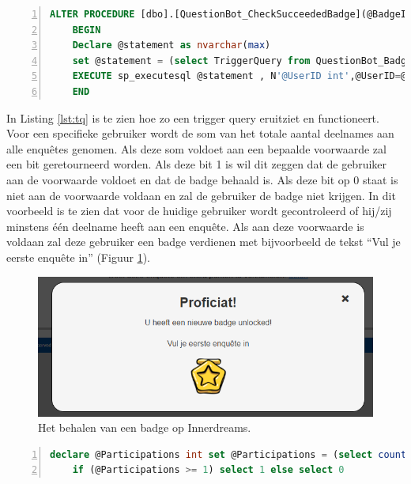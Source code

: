 \begin{lstlisting}[caption={De CheckSucceededBadge stored procedure.},
    label={lst:csb},
    language=SQL,
    showspaces=false,
    basicstyle=\ttfamily,
    numbers=left,
    numberstyle=\tiny,
    numbersep=1pt,
    breaklines=true
    commentstyle=\color{gray}]
    ALTER PROCEDURE [dbo].[QuestionBot_CheckSucceededBadge](@BadgeID int, @UserID int) as
    BEGIN
    Declare @statement as nvarchar(max) 
    set @statement = (select TriggerQuery from QuestionBot_Badge where ID = @BadgeID) 
    EXECUTE sp_executesql @statement , N'@UserID int',@UserID=@UserID
    END
\end{lstlisting}

In Listing \ref{lst:tq} is te zien hoe zo een trigger query eruitziet en functioneert. Voor een specifieke gebruiker wordt de som van het totale aantal deelnames aan alle enquêtes genomen. Als deze som voldoet aan een bepaalde voorwaarde zal een bit geretourneerd worden. Als deze bit 1 is wil dit zeggen dat de gebruiker aan de voorwaarde voldoet en dat de badge behaald is. Als deze bit op 0 staat is niet aan de voorwaarde voldaan en zal de gebruiker de badge niet krijgen. In dit voorbeeld is te zien dat voor de huidige gebruiker wordt gecontroleerd of hij/zij minstens één deelname heeft aan een enquête. Als aan deze voorwaarde is voldaan zal deze gebruiker een badge verdienen met bijvoorbeeld de tekst ``Vul je eerste enquête in'' (Figuur \ref{fig:badgeunlocked}).

\begin{figure}
    \includegraphics[width=\linewidth]{BadgeUnlocked.png}
    \caption{Het behalen van een badge op Innerdreams.}
    \label{fig:badgeunlocked}
\end{figure}

\begin{lstlisting}[caption={De trigger query van een badge.},
    label={lst:tq},
    language=SQL,
    showspaces=false,
    basicstyle=\ttfamily,
    numbers=left,
    numberstyle=\tiny,
    numbersep=1pt,
    breaklines=true
    commentstyle=\color{gray}]
    declare @Participations int set @Participations = (select count(*) from QuestionBot_Participations where UserID = @UserID) 
    if (@Participations >= 1) select 1 else select 0
\end{lstlisting}

